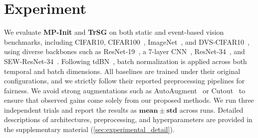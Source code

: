 \section{Experiment}

We evaluate \textbf{MP-Init} and \textbf{TrSG} on both static and event-based vision benchmarks, including CIFAR10, CIFAR100~\cite{cifar}, ImageNet~\cite{imagenet}, and DVS-CIFAR10~\cite{dvscifar10}, using diverse backbones such as ResNet-19~\cite{zheng:2021}, a 7-layer CNN~\cite{tebn:2022,tab:2024}, ResNet-34~\cite{resnet}, and SEW-ResNet-34~\cite{fang:2021_2}. Following tdBN~\cite{zheng:2021}, batch normalization is applied across both temporal and batch dimensions. All baselines are trained under their original configurations, and we strictly follow their reported preprocessing pipelines for fairness. We avoid strong augmentations such as AutoAugment~\cite{autoaug} or Cutout~\cite{cutout} to ensure that observed gains come solely from our proposed methods. We run three independent trials and report the results as \(\mathbf{mean}\pm\mathbf{std}\) across runs. Detailed descriptions of architectures, preprocessing, and hyperparameters are provided in the supplementary material (\cref{sec:experimental_detail}).



